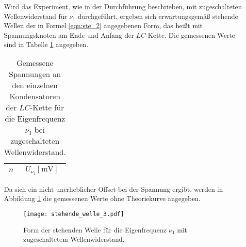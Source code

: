 Wird das Experiment, wie in der Durchführung beschrieben, mit zugeschalteten Wellenwiderstand für $\nu_1$ durchgeführt, ergeben sich erwartungsgemäß stehende Wellen der in Formel \ref{eqn:ste_2} angegebenen Form, das heißt mit Spannungsknoten am Ende und Anfang der $LC$-Kette.
Die gemessenen Werte sind in Tabelle \ref{tab:stehend2} angegeben.
\begin{table}[H]
  \centering
  \caption{Gemessene Spannungen an den einzelnen Kondensatoren der $LC$-Kette für die Eigenfrequenz $\nu_1$ bei zugeschalteten Wellenwiderstand.}
  \label{tab:stehend2}
  \begin{tabular}{c c}
    \toprule
    {$n$} & {$U_{\nu_1} [\si{\milli\volt}]$}\\
    \midrule
    
    \bottomrule
  \end{tabular}
\end{table}
Da sich ein nicht unerheblicher Offset bei der Spannung ergibt, werden in Abbildung \ref{fig:stehend3} die gemessenen Werte ohne Theoriekurve angegeben.

\begin{figure}[H]
  \centering
  \texttt{[image: stehende\_welle\_3.pdf]}
  \caption{Form der stehenden Welle für die Eigenfrequenz $\nu_1$ mit zugeschaltetem Wellenwiderstand.}
  \label{fig:stehend3}
\end{figure}
